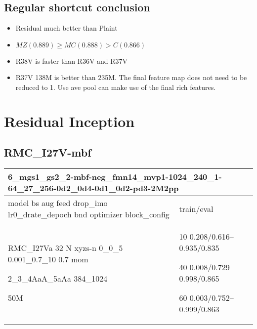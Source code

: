 \documentclass[,table,dvipsnames]{article}
\begin{document}
\subsection{Regular shortcut conclusion}
\begin{itemize}
	\item Residual much better than Plaint
	\item $MZ(0.889) \geq MC(0.888) > C(0.866)$
	\item R38V is faster than R36V and R37V
	\item R37V 138M is better than 235M. The final feature map does not need to be reduced to 1. Use ave pool can make use of the final rich features.
\end{itemize}	

\section{Residual Inception}
\subsection{RMC\_I27V-mbf}
\noindent\begin{tabular}{|p{10cm}|p{5cm}| }	
	\hline
	\multicolumn{2}{|p{15cm}|}{ 6\_mgs1\_gs2\_2-mbf-neg\_fmn14\_mvp1-1024\_240\_1-64\_27\_256-0d2\_0d4-0d1\_0d2-pd3-2M2pp }\\
	\hline
	model bs aug feed drop\_imo lr0\_drate\_depoch bnd optimizer block\_config & train/eval \\
	
	\rowcolor{red!20}
	RMC\_I27Va 32 N xyzs-n 0\_0\_5 0.001\_0.7\_10 0.7 mom\par 2\_3\_4AaA\_5aAa 384\_1024\par 50M& 
	10 0.208/0.616--0.935/0.835\par 40 0.008/0.729--0.998/0.865\par 60 0.003/0.752--0.999/0.863\\
	
	
	\hline 
\end{tabular}
\end{document}

